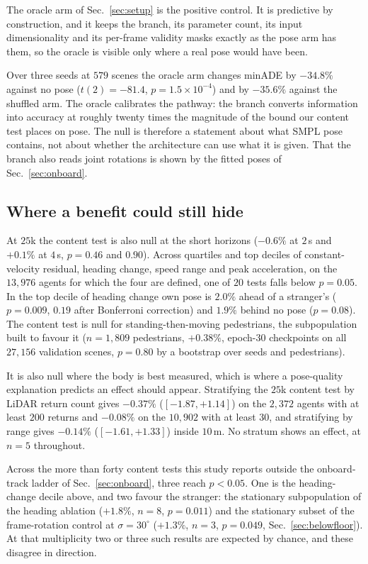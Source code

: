 \documentclass[conference]{IEEEtran}
\newcommand{\minADE}{minADE\xspace}
\begin{document}
The oracle arm of Sec.~\ref{sec:setup} is the positive control. It is
predictive by construction, and it keeps the branch, its
parameter count, its input dimensionality and its per-frame validity masks
exactly as the pose arm has them, so the oracle is visible only where a real
pose would have been.

Over three seeds at $579$ scenes the oracle arm changes \minADE by $-34.8\%$
against no pose ($t(2){=}-81.4$, $p{=}1.5{\times}10^{-4}$) and by $-35.6\%$
against the shuffled arm. The oracle calibrates the pathway: the
branch converts information into accuracy at roughly twenty
times the magnitude of the bound our content test places on pose. The null is
therefore a statement about what SMPL pose contains, not about whether the
architecture can use what it is given. That the branch also reads joint
rotations is shown by the fitted poses of Sec.~\ref{sec:onboard}.

\subsection{Where a benefit could still hide}
\label{sec:hide}
At $25$k the content test is also null at the short horizons ($-0.6\%$ at
$2$\,s and $+0.1\%$ at $4$\,s, $p{=}0.46$ and $0.90$). Across quartiles and top
deciles of constant-velocity residual, heading change, speed range and peak
acceleration, on the $13{,}976$ agents for which the four are defined, one of
$20$ tests falls below $p{=}0.05$. In the top decile of heading change own pose
is $2.0\%$ ahead of a stranger's ($p{=}0.009$, $0.19$ after Bonferroni
correction) and $1.9\%$ behind no pose ($p{=}0.08$). The content test is null for standing-then-moving pedestrians, the
subpopulation built to favour it ($n{=}1{,}809$ pedestrians, $+0.38\%$,
epoch-$30$ checkpoints on all $27{,}156$ validation scenes, $p{=}0.80$ by a
bootstrap over seeds and pedestrians).

It is also null where the body is best measured, which is where a
pose-quality explanation predicts an effect should appear. Stratifying the $25$k
content test by LiDAR return count gives $-0.37\%$ ($[-1.87,+1.14]$) on the
$2{,}372$ agents with at least $200$ returns and $-0.08\%$ on the $10{,}902$
with at least $30$, and stratifying by range gives $-0.14\%$ ($[-1.61,+1.33]$)
inside $10$\,m. No stratum shows an effect, at $n{=}5$ throughout.

Across the more than forty content tests this study reports outside the
onboard-track ladder of Sec.~\ref{sec:onboard}, three reach $p{<}0.05$. One is
the heading-change decile above, and two favour the stranger: the stationary
subpopulation of the heading ablation ($+1.8\%$, $n{=}8$, $p{=}0.011$) and the
stationary subset of the frame-rotation control at $\sigma{=}30^\circ$
($+1.3\%$, $n{=}3$, $p{=}0.049$, Sec.~\ref{sec:belowfloor}). At that
multiplicity two or three such results are expected by chance, and these
disagree in direction.
\end{document}
